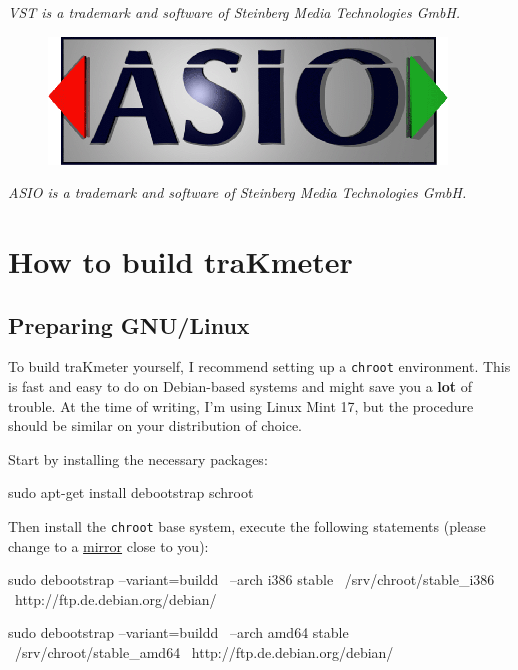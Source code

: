 \emph{VST is a trademark and software of Steinberg Media Technologies
  GmbH.}

\begin{figure}
  \includegraphics[scale=0.60,clip]{include/images/trademark_asio.png}
\end{figure}

\emph{ASIO is a trademark and software of Steinberg Media Technologies
  GmbH.}

\appendix

\chapter{How to build traKmeter}
\label{chap:build_trakmeter}

\section{Preparing GNU/Linux}

To build traKmeter yourself, I recommend setting up a \texttt{chroot}
environment.  This is fast and easy to do on Debian-based systems and
might save you a \textbf{lot} of trouble.  At the time of writing, I'm
using Linux Mint 17, but the procedure should be similar on
your distribution of choice.

Start by installing the necessary packages:

\begin{VerbatimBoth}
  sudo apt-get install debootstrap schroot
\end{VerbatimBoth}

Then install the \texttt{chroot} base system, execute the following
statements (please change  to a
\href{http://www.debian.org/mirror/list}{mirror} close to you):

\begin{Verbatim32}
  sudo debootstrap --variant=buildd \
    --arch i386 stable \
    /srv/chroot/stable_i386 \
    http://ftp.de.debian.org/debian/
\end{Verbatim32}

\begin{Verbatim64}
  sudo debootstrap --variant=buildd \
    --arch amd64 stable \
    /srv/chroot/stable_amd64 \
    http://ftp.de.debian.org/debian/
\end{Verbatim64}

